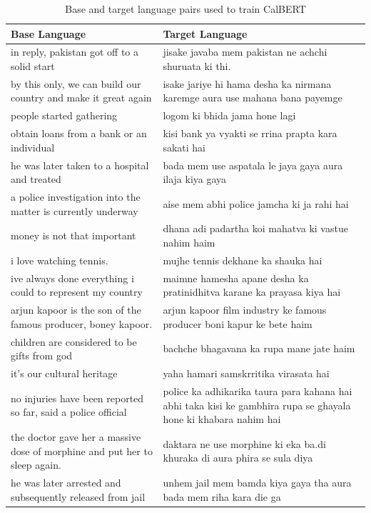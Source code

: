 \documentclass[conference]{IEEEtran}
\begin{document}
\begin{table}[htbp]
\caption{Base and target language pairs used to train CalBERT}
\label{tab:calbert_data_format}
\begin{center}
    \begin{tabular}{|p{}|p{}|}
    \hline
    \textbf{Base Language} & \textbf{Target Language} \\
    \hline
    in reply, pakistan got off to a solid start &   jisake javaba mem pakistan ne achchi shuruata ki thi.\\
    \hline
    by this only, we can build our country and make it great again & isake jariye hi hama desha ka nirmana karemge aura use mahana bana payemge \\
    \hline
    people started gathering & logom ki bhida jama hone lagi \\
    \hline
    obtain loans from a bank or an individual & kisi bank ya vyakti se rrina prapta kara sakati hai \\
    \hline 
    he was later taken to a hospital and treated & bada mem use aspatala le jaya gaya aura ilaja kiya gaya \\
    \hline
    a police investigation into the matter is currently underway & aise mem abhi police jamcha ki ja rahi hai \\
    \hline
    money is not that important & dhana adi padartha koi mahatva ki vastue nahim haim \\
    \hline
    i love watching tennis. &  mujhe tennis dekhane ka shauka hai \\
    \hline
    ive always done everything i could to represent my country & maimne hamesha apane desha ka pratinidhitva karane ka prayasa kiya hai\\
    \hline
    arjun kapoor is the son of the famous producer, boney kapoor.  & arjun kapoor film industry ke famous producer boni kapur ke bete haim \\
    \hline
    children are considered to be gifts from god & bachche bhagavana ka rupa mane jate haim \\
    \hline
    it's our cultural heritage & yaha hamari samskrritika virasata hai \\
    \hline 
    no injuries have been reported so far, said a police official & police ka adhikarika taura para kahana hai abhi taka kisi ke gambhira rupa se ghayala hone ki khabara nahim hai \\
    \hline 
    the doctor gave her a massive dose of morphine and put her to sleep again.   &   daktara ne use morphine ki eka ba.di khuraka di aura phira se sula diya \\
    \hline
    he was later arrested and subsequently released from jail & unhem jail mem bamda kiya gaya tha aura bada mem riha kara die ga \\
    \hline
    \end{tabular}
    \label{tab1}
    \end{center}
\end{table}
\end{document}
